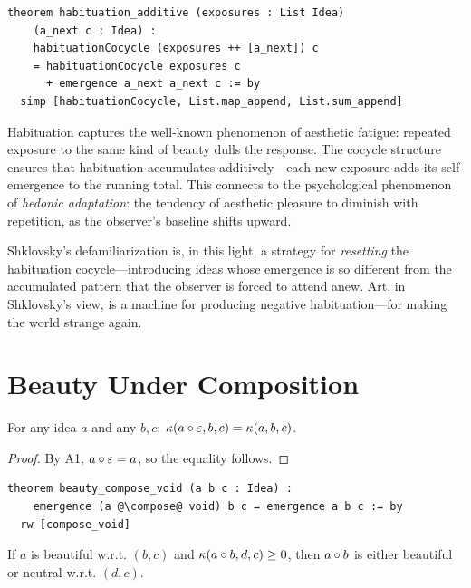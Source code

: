 \begin{lstlisting}
theorem habituation_additive (exposures : List Idea)
    (a_next c : Idea) :
    habituationCocycle (exposures ++ [a_next]) c
    = habituationCocycle exposures c
      + emergence a_next a_next c := by
  simp [habituationCocycle, List.map_append, List.sum_append]
\end{lstlisting}

\begin{interpretation}
\label{int:habituation}
Habituation captures the well-known phenomenon of aesthetic fatigue:
repeated exposure to the same kind of beauty dulls the response.  The
cocycle structure ensures that habituation accumulates additively---each
new exposure adds its self-emergence to the running total.  This connects
to the psychological phenomenon of \emph{hedonic adaptation}: the tendency
of aesthetic pleasure to diminish with repetition, as the observer's
baseline shifts upward.

Shklovsky's defamiliarization is, in this light, a strategy for
\emph{resetting} the habituation cocycle---introducing ideas whose
emergence is so different from the accumulated pattern that the observer
is forced to attend anew.  Art, in Shklovsky's view, is a machine for
producing negative habituation---for making the world strange again.
\end{interpretation}

\section{Beauty Under Composition}
\label{sec:kant:composition}

\begin{theorem}
\label{thm:beauty-compose-void}
For any idea $a$ and any $b, c$:
$\kappa(a \circ \varepsilon, b, c) = \kappa(a, b, c)$.
\end{theorem}

\begin{proof}
By A1, $a \circ \varepsilon = a$, so the equality follows.
\end{proof}

\begin{lstlisting}
theorem beauty_compose_void (a b c : Idea) :
    emergence (a @\compose@ void) b c = emergence a b c := by
  rw [compose_void]
\end{lstlisting}

\begin{theorem}
\label{thm:composing-beautiful}
If $a$ is beautiful w.r.t. $(b, c)$ and $\kappa(a \circ b, d, c) \geq 0$,
then $a \circ b$ is either beautiful or neutral w.r.t. $(d, c)$.
\end{theorem}

